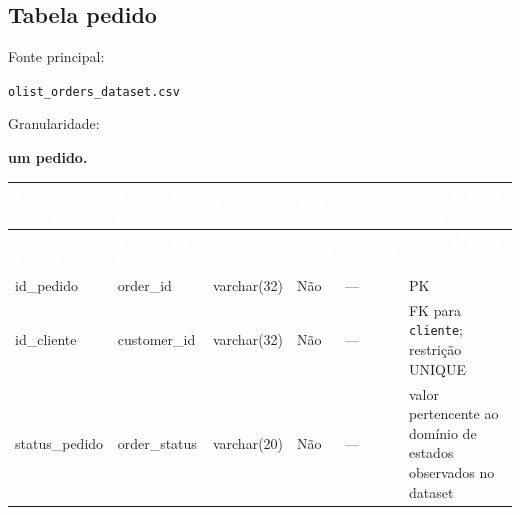 \documentclass[12pt,a4paper]{article}
\begin{document}
	\subsection{Tabela pedido}
	
	Fonte principal:
	
	\texttt{olist\_orders\_dataset.csv}
	
	Granularidade:
	
	\textbf{um pedido.}
	

	\small
	\renewcommand{\arraystretch}{1.18}
	
	\begin{longtable}{
			|>{\raggedright\arraybackslash}p{2.6cm}|
			>{\raggedright\arraybackslash}p{3.4cm}|
			>{\raggedright\arraybackslash}p{2.2cm}|
			>{\centering\arraybackslash}p{1cm}|
			>{\raggedright\arraybackslash}p{1.2cm}|
			>{\raggedright\arraybackslash}p{3cm}|
		}
		
		\hline
		\rowcolor{AzulCorporativo}
		
		\textcolor{white}{\textbf{Coluna CORE}} &
		\textcolor{white}{\textbf{Coluna de origem}} &
		\textcolor{white}{\textbf{Tipo}} &
		\textcolor{white}{\textbf{Nulo}} &
		\textcolor{white}{\textbf{Padrão}} &
		\textcolor{white}{\textbf{Integridade e observações}}
		\\ \hline
		
		\endfirsthead
		
		\hline
		\rowcolor{AzulCorporativo}
		
		\textcolor{white}{\textbf{Coluna CORE}} &
		\textcolor{white}{\textbf{Coluna de origem}} &
		\textcolor{white}{\textbf{Tipo}} &
		\textcolor{white}{\textbf{Nulo}} &
		\textcolor{white}{\textbf{Padrão}} &
		\textcolor{white}{\textbf{Integridade e observações}}
		\\ \hline
		
		\endhead
		
		id\_pedido
		&
		order\_id
		&
		varchar(32)
		&
		Não
		&
		---
		&
		PK
		\\ \hline
		
		id\_cliente
		&
		customer\_id
		&
		varchar(32)
		&
		Não
		&
		---
		&
		FK para \texttt{cliente}; restrição UNIQUE
		\\ \hline
		
		status\_pedido
		&
		order\_status
		&
		varchar(20)
		&
		Não
		&
		---
		&
		valor pertencente ao domínio de estados observados no dataset
		\\ \hline
		

\end{longtable}
\end{document}
